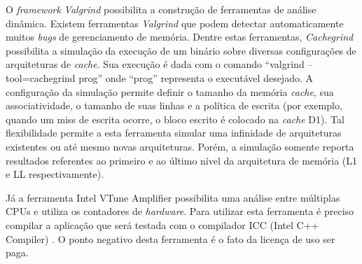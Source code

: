 O \textit{framework} \textit{Valgrind} \cite{valgrind} possibilita a construção de ferramentas de análise dinâmica.
Existem ferramentas \textit{Valgrind} que podem detectar automaticamente muitos \textit{bugs} de gerenciamento de memória.
Dentre estas ferramentas, \textit{Cachegrind} \cite{cachegrind} possibilita a simulação da execução de um binário sobre diversas configurações de arquiteturas de \textit{cache}.
Sua execução é dada com o comando ``valgrind --tool=cachegrind prog'' onde ``prog'' representa o executável desejado.
A configuração da simulação permite definir o tamanho da memória \textit{cache}, sua associatividade, o tamanho de suas linhas e a política de escrita (por exemplo, quando um miss de escrita ocorre, o bloco escrito é colocado na \textit{cache} D1).
Tal flexibilidade permite a esta ferramenta simular uma infinidade de arquiteturas existentes ou até mesmo novas arquiteturas.
Porém, a simulação somente reporta resultados referentes ao primeiro e ao último nível da arquitetura de memória (L1 e LL respectivamente).


Já a ferramenta Intel VTune Amplifier \cite{intelVtune} possibilita uma análise entre múltiplas CPUs e utiliza os contadores de \textit{hardware}. 
Para utilizar esta ferramenta é preciso compilar a aplicação que será testada com o compilador ICC (Intel C++ Compiler) \cite{icc}.
O ponto negativo desta ferramenta é o fato da licença de uso ser paga.






